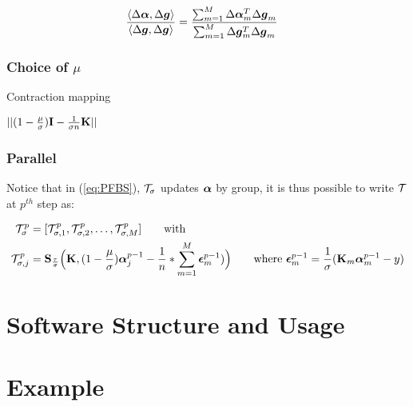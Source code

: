 \documentclass[tablecaption=bottom,wcp]{jmlr} %
\begin{document}
\begin{align*}
\frac{\langle \Delta \boldsymbol{\alpha}, \Delta {\mbox{\boldmath$g$}}  \rangle}
{\langle \Delta {\mbox{\boldmath$g$}}, \Delta {\mbox{\boldmath$g$}}  \rangle} &= 
\frac{
\sum_{m=1}^M \Delta \boldsymbol{\alpha}_m^T  \Delta {\mbox{\boldmath$g$}}_m}
{\sum_{m=1}^M \Delta {\mbox{\boldmath$g$}}_m^T \Delta {\mbox{\boldmath$g$}}_m}
\end{align*}

\subsubsection{Choice of $\mu$}
\citep{rosasco-prox-2009}


Contraction mapping


$||(1 - \frac{\mu}{\sigma}){\bf I} - \frac{1}{\sigma n} {\bf K} ||$

\subsubsection{Parallel}

Notice that in (\ref{eq:PFBS}), ${\cal T}_\sigma$ updates $\boldsymbol{\alpha}$ by group, it is thus possible to write ${\cal T}$ at $p^{th}$ step as:

\begin{align*}
{\cal T}^p_\sigma &= [{\cal T}^p_{\sigma, 1}, {\cal T}^p_{\sigma, 2}, \dots, {\cal T}^p_{\sigma, M}] \qquad \mbox{with}\\
{\cal T}^p_{\sigma, j} &= 
\textbf{S}_{\frac{\tau}{\sigma}}
\Big({\bf K}, (1-\frac{\mu}{\sigma})\boldsymbol{\alpha}^{p-1}_j - 
\frac{1}{n} * \sum_{m=1}^M \boldsymbol{\epsilon}_{m}^{p-1}  )
\Big) \qquad \mbox{where } 
\boldsymbol{\epsilon}_{m}^{p-1}= 
\frac{1}{\sigma} ({\bf K}_m \boldsymbol{\alpha}^{p-1}_m - y)
\end{align*}

\begin{comment}
\subsubsection{Alternative Regularization through Early Stopping}
\citet{micchelli-convex-2005}
\end{comment}

\section{Software Structure and Usage}

\section{Example}
\end{document}
